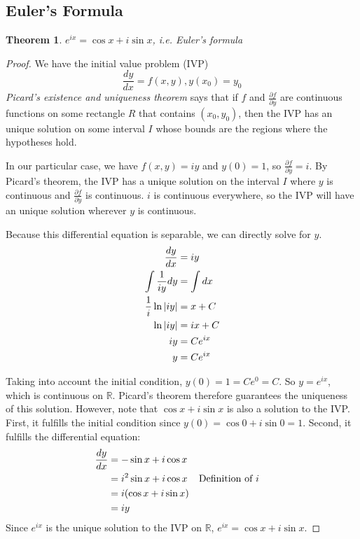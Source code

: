 \documentclass[11pt, oneside]{article}
\theoremstyle{plain}
\newtheorem{theorem}{Theorem}[section]
\theoremstyle{definition}
\begin{document}
\subsection{Euler's Formula}
\label{subsec:euler}
\begin{theorem}
  \( e^{ix} = \cos x + i \sin x \), i.e. Euler's formula 
\end{theorem}
\begin{proof}
  We have the initial value problem (IVP) 
\[ \frac{dy}{dx} = f(x, y), y(x_0) = y_0 \]
\textit{Picard's existence and uniqueness theorem} says that if \( f \) and
\( \frac{\partial f}{\partial y} \) are continuous functions on some rectangle
\( R \) that contains \( (x_0, y_0) \), then the IVP has an unique solution
on some interval \( I \) whose bounds are the regions where the hypotheses hold.

In our particular case, we have \( f(x, y) = iy \) and \( y(0) = 1 \),
so \( \frac{\partial f}{\partial y} = i \). By Picard's theorem, the IVP has a 
unique solution on the interval \( I \) where \( y \) is continuous and
\( \frac{\partial f}{\partial y} \) is continuous. \( i \) is continuous
everywhere, so the IVP will have an unique solution
wherever \( y \) is continuous.

Because this differential equation is separable, we can directly solve
for \( y \).
\begin{align*}
  \frac{dy}{dx} &= iy \\
  \int \frac{1}{iy} dy &= \int dx \\
  \frac{1}{i} \ln{\abs{iy}} &= x + C \\
  \ln{\abs{iy}} &= ix + C \\
  iy &= Ce^{ix} \\
  y &= Ce^{ix}
\end{align*}

Taking into account the initial condition, \( y(0) = 1 = Ce^0 = C \).
So \( y = e^{ix} \), which is continuous on \( \mathbb{R} \).
Picard's theorem therefore guarantees the uniqueness of this solution.
However, note that \( \cos x + i \sin x \) is also a solution to the IVP.
First, it fulfills the initial condition since
\( y(0) = \cos 0 + i \sin 0 = 1 \).
Second, it fulfills the differential equation:
\begin{align*}
  \frac{dy}{dx} &= -\sin x + i \cos x \\
                &= i^2 \sin x + i \cos x && \text{Definition of \( i \)} \\
                &= i(\cos x + i \sin x) \\
                &= iy
\end{align*}
Since \( e^{ix} \) is the unique solution to the IVP on \( \mathbb{R} \),
\( e^{ix} = \cos x + i \sin x \).
\end{proof}
\end{document}
